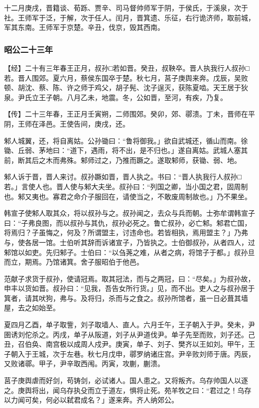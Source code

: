 \documentclass[]{article}
\begin{document}
十二月庚戌，晋籍谈、荀跞、贾辛、司马督帅师军于阴，于侯氏，于溪泉，次于社。王师军于泛，于解，次于任人。闰月，晋箕遗、乐征，右行诡济师，取前城，军其东南。王师军于京楚。辛丑，伐京，毁其西南。

\hypertarget{header-n2737}{%
\subsubsection{昭公二十三年}\label{header-n2737}}

【经】二十有三年春王正月，叔孙□若如晋。癸丑，叔鞅卒。晋人执我行人叔孙□若。晋人围郊。夏六月，蔡侯东国卒于楚。秋七月，莒子庚舆来奔。戊辰，吴败顿、胡沈、蔡、陈、许之师于鸡父，胡子髡、沈子逞灭，获陈夏啮。天王居于狄泉。尹氏立王子朝。八月乙未，地震。冬，公如晋，至河，有疾，乃复。

【传】二十三年春，王正月壬寅朔，二师围郊。癸卯，郊、鄩溃。丁未，晋师在平阴，王师在泽邑。王使告间，庚戌，还。

邾人城翼，还，将自离姑。公孙锄曰：``鲁将御我。」欲自武城还，循山而南。徐锄、丘弱、茅地曰：``道下，遇雨，将不出，是不归也。」遂自离姑。武城人塞其前，断其后之木而弗殊。邾师过之，乃推而蹶之。遂取邾师，获锄、弱、地。

邾人诉于晋，晋人来讨。叔孙蹶如晋，晋人执之。书曰：``晋人执我行人叔孙□若。」言使人也。晋人使与邾大夫坐。叔孙曰：``列国之卿，当小国之君，固周制也。邾又夷也。寡君之命介子服回在，请使当之，不敢废周制故也。」乃不果坐。

韩宣子使邾人取其众，将以叔孙与之。叔孙闻之，去众与兵而朝。士弥牟谓韩宣子曰：``子弗良图，而以叔孙与其仇，叔孙必死之。鲁亡叔孙，必亡邾。邾君亡国，将焉归？子虽悔之，何及？所谓盟主，讨违命也。若皆相执，焉用盟主？」乃弗与，使各居一馆。士伯听其辞而诉诸宣子，乃皆执之。士伯御叔孙，从者四人，过邾馆以如吏。先归邾子。士伯曰：``以刍荛之难，从者之病，将馆子于都。」叔孙旦而立，期焉。乃馆诸箕。舍子服昭伯于他邑。

范献子求货于叔孙，使请冠焉。取其冠法，而与之两冠，曰：``尽矣。」为叔孙故，申丰以货如晋。叔孙曰：``见我，吾告女所行货。」见，而不出。吏人之与叔孙居于箕者，请其吠狗，弗与。及将归，杀而与之食之。叔孙所馆者，虽一日必葺其墙屋，去之如始至。

夏四月乙酉，单子取訾，刘子取墙人、直人。六月壬午，王子朝入于尹。癸未，尹圉诱刘佗杀之。丙戌，单子从阪道，刘子从尹道伐尹。单子先至而败，刘子还。己丑，召伯奂、南宫极以成周人戍尹。庚寅，单子、刘子、樊齐以王如刘。甲午，王子朝入于王城，次于左巷。秋七月戊申，鄩罗纳诸庄宫。尹辛败刘师于唐。丙辰，又败诸鄩。甲子，尹辛取西闱。丙寅，攻蒯，蒯溃。

莒子庚舆虐而好剑，苟铸剑，必试诸人。国人患之。又将叛齐。乌存帅国人以逐之。庚舆将出，闻乌存执殳而立于道左，惧将止死。苑羊牧之曰：``君过之！乌存以力闻可矣，何必以弑君成名？」遂来奔。齐人纳郊公。
\end{document}
